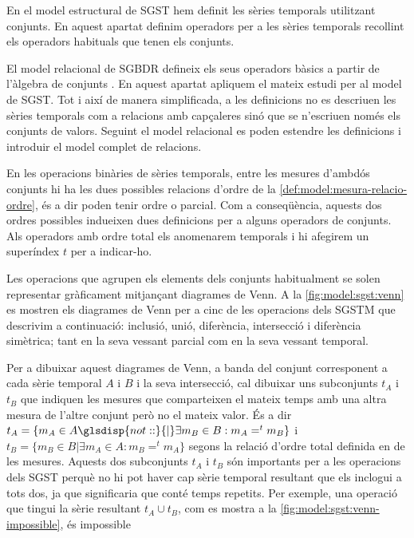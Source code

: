 En el model estructural de \gls{SGST} hem definit les sèries temporals
utilitzant conjunts. En aquest apartat definim operadors per a les
sèries temporals recollint els operadors habituals que tenen els
conjunts.   

El model relacional de \gls{SGBDR} defineix els seus operadors bàsics
a partir de l'àlgebra de
conjunts \parencite[cap.~7]{date04:introduction8}. En aquest apartat
apliquem el mateix estudi per al model de \gls{SGST}. Tot i així de
manera simplificada, a les definicions no es descriuen les sèries
temporals com a relacions amb capçaleres sinó que se n'escriuen només
els conjunts de valors. Seguint el model relacional es poden estendre
les definicions i introduir el model complet de relacions.



En les operacions binàries de sèries temporals, entre les mesures
d'ambdós conjunts hi ha les dues possibles relacions d'ordre de la
\autoref{def:model:mesura-relacio-ordre}, és a dir poden tenir ordre o
parcial. Com a conseqüència, aquests dos ordres possibles indueixen
dues definicions per a alguns operadors de conjunts. Als operadors amb
ordre total els anomenarem temporals i hi afegirem un superíndex $t$
per a indicar-ho.


Les operacions que agrupen els elements dels conjunts habitualment se
solen representar gràficament mitjançant diagrames de Venn. A la
\autoref{fig:model:sgst:venn} es mostren els diagrames de Venn per a
cinc de les operacions dels \gls{SGSTM} que descrivim a continuació:
inclusió, unió, diferència, intersecció i diferència simètrica; tant
en la seva vessant parcial com en la seva vessant temporal.  

Per a dibuixar aquest diagrames de Venn, a banda del conjunt
corresponent a cada sèrie temporal $A$ i $B$ i la seva intersecció,
cal dibuixar uns subconjunts $t_A$ i $t_B$ que indiquen les mesures
que comparteixen el mateix temps amb una altra mesura de l'altre
conjunt però no el mateix valor. És a dir $t_A = \{ m_A \in A \glsdisp{not::}{|}
\exists m_B \in B: m_A =^t m_B \}$ i $t_B = \{ m_B \in B | \exists m_A
\in A: m_B =^t m_A \}$ segons la relació d'ordre total definida en de
les mesures.  Aquests dos subconjunts $t_A$ i $t_B$ són importants per
a les operacions dels \gls{SGST} perquè no hi pot haver cap sèrie
temporal resultant que els inclogui a tots dos, ja que significaria
que conté temps repetits. Per exemple, una operació que tingui la
sèrie resultant $t_A \cup t_B$, com es mostra a la
\autoref{fig:model:sgst:venn-impossible}, és impossible


